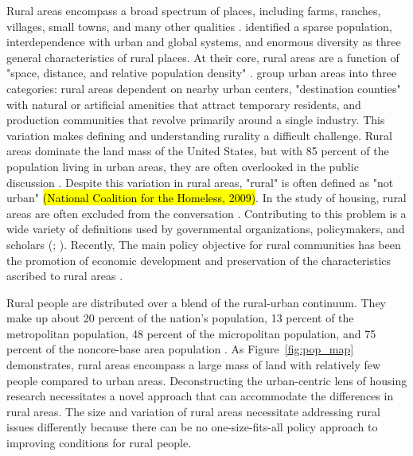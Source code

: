  Rural areas encompass a broad spectrum of places, including farms, ranches, villages, small towns, and many other qualities \citep{cromartie_defining_2008}. \citet{castle_conceptual_1998} identified a sparse population, interdependence with urban and global systems, and enormous diversity as three general characteristics of rural places.  At their core, rural areas are a function of "space, distance, and relative population density" \citep[?]{castle_place_2011}. \citet{shoup_principles_2010} group urban areas into three categories: rural areas dependent on nearby urban centers, "destination counties" with natural or artificial amenities that attract temporary residents, and production communities that revolve primarily around a single industry. This variation makes defining and understanding rurality a difficult challenge. Rural areas dominate the land mass of the United States, but with 85 percent of the population living in urban areas, they are often overlooked in the public discussion \citep{pendall_future_2016}. Despite this variation in rural areas,  "rural" is often defined as "not urban" 
 \hl{(National Coalition for the Homeless, 2009)}. In the study of housing, rural areas are often excluded from the conversation \citep{gkartzios_housing_2017}. Contributing to this problem is a wide variety of definitions used by governmental organizations, policymakers, and scholars (\citealp{yousey_defining_2018}; \citealp{cromartie_defining_2008}). Recently, The main policy objective for rural communities has been the promotion of economic development and preservation of the characteristics ascribed to rural areas \citep{lichter_changing_2007}. 

Rural people are distributed over a blend of the rural-urban continuum. They make up about 20 percent of the nation's population, 13 percent of the metropolitan population, 48 percent of the micropolitan population, and 75 percent of the noncore-base area population \citep{isserman_national_2005}. As Figure~\ref{fig:pop_map} demonstrates, rural areas encompass a large mass of land with relatively few people compared to urban areas. Deconstructing the urban-centric lens of housing research necessitates a novel approach that can accommodate the differences in rural areas. The size and variation of rural areas necessitate addressing rural issues differently because there can be no one-size-fits-all policy approach to improving conditions for rural people. 

